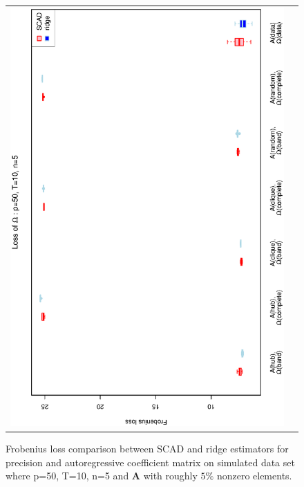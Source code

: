 \documentclass[a4paper]{article}
\begin{document}
\begin{figure}[h!]
\begin{tabular}{cc}
\includegraphics[scale=0.45,angle=270]{LossOmega50T10N5_5.eps}\\
\end{tabular}
\caption{Frobenius loss comparison between SCAD and ridge estimators for precision and autoregressive coefficient matrix on simulated data set where p=50, T=10, n=5 and $\mathbf{A}$ with roughly $5\%$ nonzero elements.}
\label{figSM:Loss50T10N5_5}
\end{figure}
\clearpage

\end{document}
